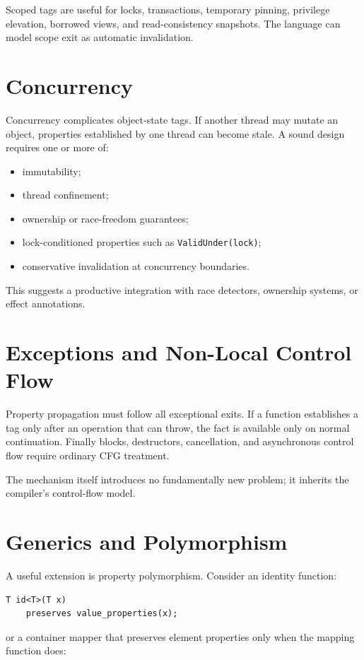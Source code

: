 \documentclass[11pt]{article}
\begin{document}
Scoped tags are useful for locks, transactions, temporary pinning, privilege elevation, borrowed views, and read-consistency snapshots. The language can model scope exit as automatic invalidation.

\section{Concurrency}
Concurrency complicates object-state tags. If another thread may mutate an object, properties established by one thread can become stale. A sound design requires one or more of:
\begin{itemize}
  \item immutability;
  \item thread confinement;
  \item ownership or race-freedom guarantees;
  \item lock-conditioned properties such as \texttt{ValidUnder(lock)};
  \item conservative invalidation at concurrency boundaries.
\end{itemize}

This suggests a productive integration with race detectors, ownership systems, or effect annotations.

\section{Exceptions and Non-Local Control Flow}
Property propagation must follow all exceptional exits. If a function establishes a tag only after an operation that can throw, the fact is available only on normal continuation. Finally blocks, destructors, cancellation, and asynchronous control flow require ordinary CFG treatment.

The mechanism itself introduces no fundamentally new problem; it inherits the compiler's control-flow model.

\section{Generics and Polymorphism}
A useful extension is property polymorphism. Consider an identity function:

\begin{lstlisting}
T id<T>(T x)
    preserves value_properties(x);
\end{lstlisting}

or a container mapper that preserves element properties only when the mapping function does:
\end{document}
